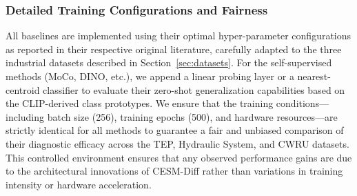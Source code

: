 \subsubsection{Detailed Training Configurations and Fairness}
All baselines are implemented using their optimal hyper-parameter configurations as reported in their respective original literature, carefully adapted to the three industrial datasets described in Section~\ref{sec:datasets}. For the self-supervised methods (MoCo, DINO, etc.), we append a linear probing layer or a nearest-centroid classifier to evaluate their zero-shot generalization capabilities based on the CLIP-derived class prototypes. We ensure that the training conditions---including batch size (256), training epochs (500), and hardware resources---are strictly identical for all methods to guarantee a fair and unbiased comparison of their diagnostic efficacy across the TEP, Hydraulic System, and CWRU datasets. This controlled environment ensures that any observed performance gains are due to the architectural innovations of CESM-Diff rather than variations in training intensity or hardware acceleration.
